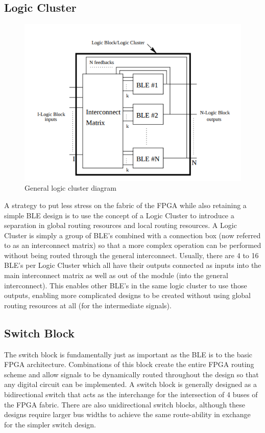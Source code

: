 \documentclass[12pt]{article}
\begin{document}
\subsection{Logic Cluster} \label{logicCluster}

\begin{figure}[ht]
  \centering
  \includegraphics[width=.7\textwidth]{logicclusterex}
  \caption{General logic cluster diagram \cite{masud_1999}}
  \label{fig:logiccluster_ex}
\end{figure}

A strategy to put less stress on the fabric of the FPGA while also retaining a simple 
BLE design is to use the concept of a Logic Cluster to introduce a separation in 
global routing resources and local routing resources. A Logic Cluster is simply a 
group of BLE’s combined with a connection box (now referred to as an interconnect matrix)
so that a more complex operation 
can be performed without being routed through the general interconnect. Usually, 
there are 4 to 16 BLE’s per Logic Cluster which all have their outputs connected 
as inputs into the main interconnect matrix as well as out of the module (into the 
general interconnect). This enables other BLE’s in the same logic cluster to use 
those outputs, enabling more complicated designs to be created without using global 
routing resources at all (for the intermediate signals).

\subsection{Switch Block}
The switch block is fundamentally just as important as the BLE is to the basic FPGA 
architecture. Combinations of this block create the entire FPGA routing scheme and 
allow signals to be dynamically routed throughout the design so that any digital 
circuit can be implemented. A switch block is generally designed as a bidirectional 
switch that acts as the interchange for the intersection of 4 buses of the FPGA fabric.
There are also unidirectional switch blocks, although these designs require larger 
bus widths to achieve the same route-ability in exchange for the simpler switch design.
\end{document}
